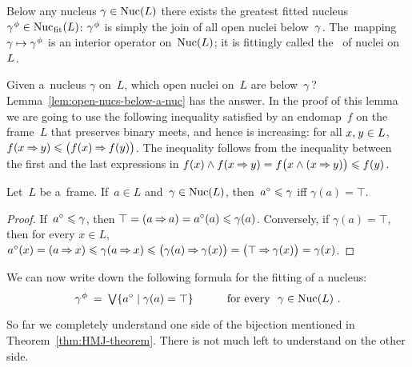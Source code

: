 \documentclass[11pt,letterpaper]{article}
\renewcommand{\thmskip}{\bigskip}
\renewcommand{\interskip}{\medskip}
\begin{document}
Below any nucleus $\gamma\in\mathop{\smash{\mathrm{Nuc}}}\nolimits(L)$
there exists the greatest fitted nucleus ${\gamma\mspace{1mu}}^\phi\in\mathop{\smash{\mathrm{Nuc}}}\nolimits_{\mspace{1mu}\mathrm{fit}\mspace{-1mu}}\mspace{1mu}(L)$:
${\gamma\mspace{1mu}}^\phi$ is simply the join of all open nuclei below~$\gamma\mspace{1mu}$.
The~mapping $\gamma\mapsto{\gamma\mspace{1mu}}^\phi$ is an interior operator on~$\mathop{\smash{\mathrm{Nuc}}}\nolimits(L)$;
it is fittingly called the~ of nuclei on~$L\mspace{1mu}$.

\txtskip

Given a~nucleus $\gamma$ on~$L$, which open nuclei on~$L$ are below~$\gamma\mspace{1mu}$?
Lemma~\ref{lem:open-nucs-below-a-nuc} has the answer.
In the proof of this lemma we are going to use the following
inequality satisfied by an endomap~$f$ on the frame~$L$
	that preserves binary meets, and hence is increasing:
for all $x,\mspace{1mu} y\in L$, $f(x\bimpl y)\leq \bigl(f(x)\bimpl\nolinebreak f(y)\bigr)$.
The inequality follows from the inequality between the first and the last expressions in
$f(x)\wedge f(x\mathbin{\Rightarrow} y) = f\bigl(x\wedge(x\mathbin{\Rightarrow} y)\bigr) \leqslant f(y)$.

\thmskip

\begin{lemma}\label{lem:open-nucs-below-a-nuc}
Let\/~$L$ be a~frame.
If\/~$a\in L$ and\/~$\gamma\in\mathop{\smash{\mathrm{Nuc}}}\nolimits(L)$, then\/~$a{}^\circ\leqslant\gamma$ iff\/ $\gamma(a)=\top$.
\end{lemma}

\interskip

\begin{proof}
If~$a{}^\circ\leqslant\gamma$, then $\top = (a\mathbin{\Rightarrow} a) = a{}^\circ(a) \leqslant \gamma(a)$.
%
Conversely, if $\gamma(a) = \top$,
then for every $x\in L$,
$a{}^\circ(x) = (a\mathbin{\Rightarrow} x) \leqslant \gamma(a\mathbin{\Rightarrow} x) \leqslant \bigl(\gamma(a)\mathbin{\Rightarrow}\gamma(x)\bigr)
= \bigl(\top\mathbin{\Rightarrow}\gamma(x)\bigr) = \gamma(x)$.
\end{proof}

\thmskip

We can now write down the following formula for the fitting of a nucleus:
%
\begin{equation}\label{eq:fitting-formula}
{\gamma\tinysp}^\fitit \Eq \tJoin\set{a\open\suchthat\gamma(a)=\top}
	\qquad\quad \text{for every \ $\gamma\in\Nuc(L)$}~.
\end{equation}
%

\negdisplayshortskip
\thmskip

So far we completely understand one side of the bijection mentioned in Theorem~\ref{thm:HMJ-theorem}.
There is not much left to understand on the other side.
\end{document}
